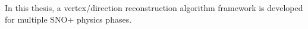 In this thesis, a vertex/direction reconstruction algorithm framework is developed for multiple SNO+ physics phases.